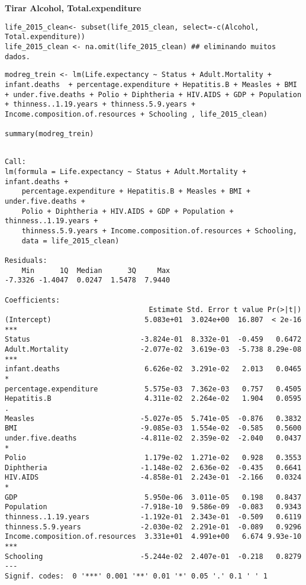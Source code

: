 \documentclass[11pt]{article}
\begin{document}
\begin{enumerate}
\textbf{Tirar Alcohol, Total.expenditure}

\begin{verbatim}
life_2015_clean<- subset(life_2015_clean, select=-c(Alcohol, Total.expenditure))
life_2015_clean <- na.omit(life_2015_clean) ## eliminando muitos dados.
\end{verbatim}


\begin{verbatim}
modreg_trein <- lm(Life.expectancy ~ Status + Adult.Mortality + infant.deaths  + percentage.expenditure + Hepatitis.B + Measles + BMI + under.five.deaths + Polio + Diphtheria + HIV.AIDS + GDP + Population + thinness..1.19.years + thinness.5.9.years + Income.composition.of.resources + Schooling , life_2015_clean)

summary(modreg_trein)
\end{verbatim}

\begin{verbatim}

Call:
lm(formula = Life.expectancy ~ Status + Adult.Mortality + infant.deaths + 
    percentage.expenditure + Hepatitis.B + Measles + BMI + under.five.deaths + 
    Polio + Diphtheria + HIV.AIDS + GDP + Population + thinness..1.19.years + 
    thinness.5.9.years + Income.composition.of.resources + Schooling, 
    data = life_2015_clean)

Residuals:
    Min      1Q  Median      3Q     Max 
-7.3326 -1.4047  0.0247  1.5478  7.9440 

Coefficients:
                                  Estimate Std. Error t value Pr(>|t|)    
(Intercept)                      5.083e+01  3.024e+00  16.807  < 2e-16 ***
Status                          -3.824e-01  8.332e-01  -0.459   0.6472    
Adult.Mortality                 -2.077e-02  3.619e-03  -5.738 8.29e-08 ***
infant.deaths                    6.626e-02  3.291e-02   2.013   0.0465 *  
percentage.expenditure           5.575e-03  7.362e-03   0.757   0.4505    
Hepatitis.B                      4.311e-02  2.264e-02   1.904   0.0595 .  
Measles                         -5.027e-05  5.741e-05  -0.876   0.3832    
BMI                             -9.085e-03  1.554e-02  -0.585   0.5600    
under.five.deaths               -4.811e-02  2.359e-02  -2.040   0.0437 *  
Polio                            1.179e-02  1.271e-02   0.928   0.3553    
Diphtheria                      -1.148e-02  2.636e-02  -0.435   0.6641    
HIV.AIDS                        -4.858e-01  2.243e-01  -2.166   0.0324 *  
GDP                              5.950e-06  3.011e-05   0.198   0.8437    
Population                      -7.918e-10  9.586e-09  -0.083   0.9343    
thinness..1.19.years            -1.192e-01  2.343e-01  -0.509   0.6119    
thinness.5.9.years              -2.030e-02  2.291e-01  -0.089   0.9296    
Income.composition.of.resources  3.331e+01  4.991e+00   6.674 9.93e-10 ***
Schooling                       -5.244e-02  2.407e-01  -0.218   0.8279    
---
Signif. codes:  0 '***' 0.001 '**' 0.01 '*' 0.05 '.' 0.1 ' ' 1


\end{verbatim}
\end{enumerate}
\end{document}
